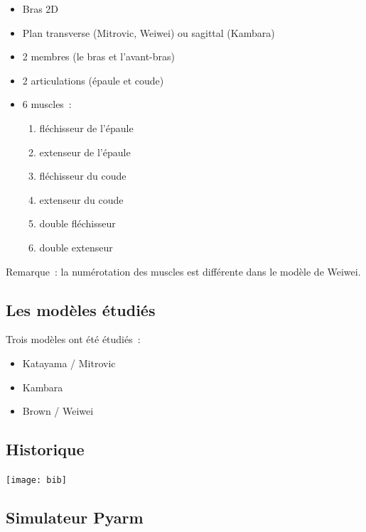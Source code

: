 \documentclass[pdftex,a4paper,11pt]{report}
\numberwithin{equation}{subsection}
\begin{document}
\begin{itemize}
    \item Bras 2D
    \item Plan transverse (Mitrovic, Weiwei) ou sagittal (Kambara)
    \item 2 membres (le bras et l'avant-bras) %
    \item 2 articulations (épaule et coude)
    \item 6 muscles~:
    \begin{enumerate}
        \item fléchisseur de l'épaule
        \item extenseur de l'épaule
        \item fléchisseur du coude
        \item extenseur du coude
        \item double fléchisseur
        \item double extenseur
    \end{enumerate}
\end{itemize}

Remarque~: la numérotation des muscles est différente dans le modèle de Weiwei.

\subsection{Les modèles étudiés}
Trois modèles ont été étudiés~:
\begin{itemize}
    \item Katayama / Mitrovic \cite{katayama1993, ozkaya1999, mitrovic2010adaptive, mitrovic2008, mitrovic2009}
    \item Kambara \cite{kambara2009, ozkaya1999}
    \item Brown / Weiwei \cite{brown1999, li2006, li2004, todorov2005}
\end{itemize}

\subsection{Historique}

\begin{center}
        \texttt{[image: bib]}
\end{center}

\subsection{Simulateur Pyarm}
\end{document}
